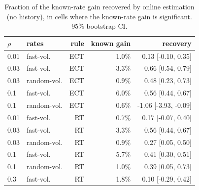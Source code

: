 \begin{table}[t]\centering\scriptsize
\caption{Fraction of the known-rate gain recovered by online estimation (no history), in cells where the known-rate gain is significant. 95\% bootstrap CI.}\label{tab:recovery}
\begin{tabular}{llrrr}
\toprule
$\rho$ & rates & rule & known gain & recovery \\
\midrule
0.01 & fast-vol. & ECT & 1.0\% & 0.13 [-0.10, 0.35]\\
0.03 & fast-vol. & ECT & 3.3\% & 0.66 [0.54, 0.79]\\
0.03 & random-vol. & ECT & 0.9\% & 0.48 [0.23, 0.73]\\
0.1 & fast-vol. & ECT & 6.0\% & 0.56 [0.44, 0.67]\\
0.1 & random-vol. & ECT & 0.6\% & -1.06 [-3.93, -0.09]\\
0.01 & fast-vol. & RT & 0.7\% & 0.17 [-0.07, 0.40]\\
0.03 & fast-vol. & RT & 3.3\% & 0.56 [0.44, 0.67]\\
0.03 & random-vol. & RT & 0.9\% & 0.27 [0.05, 0.50]\\
0.1 & fast-vol. & RT & 5.7\% & 0.41 [0.30, 0.51]\\
0.1 & random-vol. & RT & 1.0\% & 0.39 [0.05, 0.73]\\
0.3 & fast-vol. & RT & 1.8\% & 0.10 [-0.29, 0.42]\\
\bottomrule\end{tabular}\end{table}